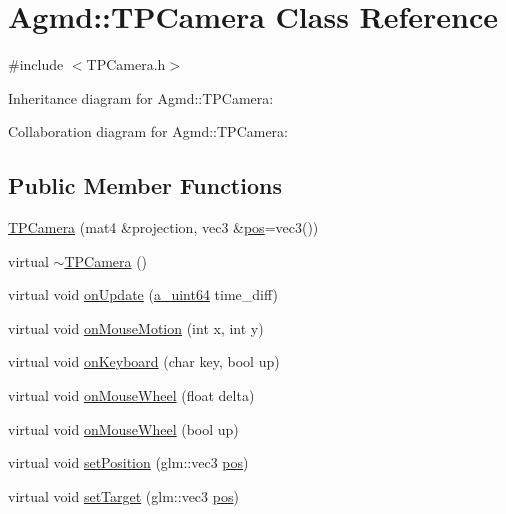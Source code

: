 \hypertarget{class_agmd_1_1_t_p_camera}{\section{Agmd\+:\+:T\+P\+Camera Class Reference}
\label{class_agmd_1_1_t_p_camera}
}


{\ttfamily \#include $<$T\+P\+Camera.\+h$>$}



Inheritance diagram for Agmd\+:\+:T\+P\+Camera\+:


Collaboration diagram for Agmd\+:\+:T\+P\+Camera\+:
\subsection*{Public Member Functions}
\begin{DoxyCompactItemize}
\item 
\hyperlink{class_agmd_1_1_t_p_camera_afc44937f2240183b40e1bfdd8a3f29fb}{T\+P\+Camera} (mat4 \&projection, vec3 \&\hyperlink{_examples_2_planet_2_app_8cpp_aa8a1c0491559faca4ebd0881575ae7f0}{pos}=vec3())
\item 
virtual \hyperlink{class_agmd_1_1_t_p_camera_ae465cca4c7a92bc6b4ba05aa4d04c050}{$\sim$\+T\+P\+Camera} ()
\item 
virtual void \hyperlink{class_agmd_1_1_t_p_camera_a4cd0db75011e1f173d0ba8849915c8a7}{on\+Update} (\hyperlink{_common_defines_8h_a6c5192ec3c55d6e5b13d2dbaa082bdea}{a\+\_\+uint64} time\+\_\+diff)
\item 
virtual void \hyperlink{class_agmd_1_1_t_p_camera_a1810fd8f0d0a54d6139d57fa4d8582e3}{on\+Mouse\+Motion} (int x, int y)
\item 
virtual void \hyperlink{class_agmd_1_1_t_p_camera_a8f42a9f4193e6638b827c2bc499530c0}{on\+Keyboard} (char key, bool up)
\item 
virtual void \hyperlink{class_agmd_1_1_t_p_camera_a7de48e08f381f1360cb7f5d868fffb9b}{on\+Mouse\+Wheel} (float delta)
\item 
virtual void \hyperlink{class_agmd_1_1_t_p_camera_aab0a8d73857d92c72491f7b8bac21998}{on\+Mouse\+Wheel} (bool up)
\item 
virtual void \hyperlink{class_agmd_1_1_t_p_camera_a74f9fc32896db29d618cf34c8b71d315}{set\+Position} (glm\+::vec3 \hyperlink{_examples_2_planet_2_app_8cpp_aa8a1c0491559faca4ebd0881575ae7f0}{pos})
\item 
virtual void \hyperlink{class_agmd_1_1_t_p_camera_ae2454e8823d2821f25c2a679dc0750f5}{set\+Target} (glm\+::vec3 \hyperlink{_examples_2_planet_2_app_8cpp_aa8a1c0491559faca4ebd0881575ae7f0}{pos})
\end{DoxyCompactItemize}
